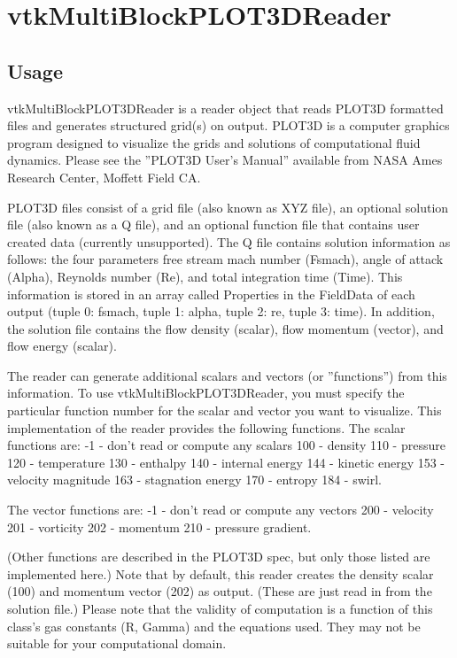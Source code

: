 \section{vtkMultiBlockPLOT3DReader}

\subsection{Usage}

 vtkMultiBlockPLOT3DReader is a reader object that reads PLOT3D formatted
 files and generates structured grid(s) on output. PLOT3D is a computer
 graphics program designed to visualize the grids and solutions of
 computational fluid dynamics. Please see the ''PLOT3D User's Manual''
 available from NASA Ames Research Center, Moffett Field CA.

 PLOT3D files consist of a grid file (also known as XYZ file), an 
 optional solution file (also known as a Q file), and an optional function 
 file that contains user created data (currently unsupported). The Q file 
 contains solution  information as follows: the four parameters free stream 
 mach number (Fsmach), angle of attack (Alpha), Reynolds number (Re), and 
 total integration time (Time). This information is stored in an array
 called Properties in the FieldData of each output (tuple 0: fsmach, tuple 1:
 alpha, tuple 2: re, tuple 3: time). In addition, the solution file contains 
 the flow density (scalar), flow momentum (vector), and flow energy (scalar).

 The reader can generate additional scalars and vectors (or ''functions'')
 from this information. To use vtkMultiBlockPLOT3DReader, you must specify the 
 particular function number for the scalar and vector you want to visualize.
 This implementation of the reader provides the following functions. The
 scalar functions are:
    -1  - don't read or compute any scalars
    100 - density
    110 - pressure
    120 - temperature
    130 - enthalpy
    140 - internal energy
    144 - kinetic energy
    153 - velocity magnitude
    163 - stagnation energy
    170 - entropy
    184 - swirl.

 The vector functions are:
    -1  - don't read or compute any vectors
    200 - velocity
    201 - vorticity
    202 - momentum
    210 - pressure gradient.

 (Other functions are described in the PLOT3D spec, but only those listed are
 implemented here.) Note that by default, this reader creates the density 
 scalar (100) and momentum vector (202) as output. (These are just read in
 from the solution file.) Please note that the validity of computation is
 a function of this class's gas constants (R, Gamma) and the equations used.
 They may not be suitable for your computational domain.

